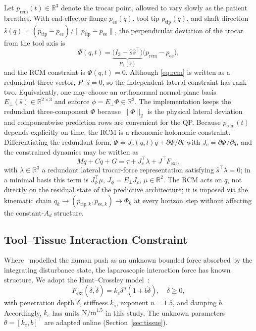 Let $p_{\text{rcm}}(t) \in \mathbb{R}^3$ denote the trocar point, allowed to vary slowly as the patient breathes. With end-effector flange $p_{\text{ee}}(q)$, tool tip $p_{\text{tip}}(q)$, and shaft direction $\hat{s}(q) = (p_{\text{tip}} - p_{\text{ee}})/\|p_{\text{tip}} - p_{\text{ee}}\|$, the perpendicular deviation of the trocar from the tool axis is
\begin{equation}
\Phi(q,t) =
\underbrace{\big(I_3-\hat{s}\hat{s}^{\top}\big)}_{P_{\perp}(\hat s)}
\big(p_{\text{rcm}} - p_{\text{ee}}\big),
\label{eq:rcm}
\end{equation}
and the RCM constraint is $\Phi(q,t) = 0$. Although \eqref{eq:rcm} is written as a redundant three-vector, $P_\perp\hat{s}=0$, so the independent lateral constraint has rank two. Equivalently, one may choose an orthonormal normal-plane basis $E_\perp(\hat{s})\in\mathbb{R}^{2\times3}$ and enforce $\phi=E_\perp\Phi\in\mathbb{R}^2$. The implementation keeps the redundant three-component $\Phi$ because $\|\Phi\|_2$ is the physical lateral deviation and componentwise prediction rows are convenient for the QP. Because $p_{\text{rcm}}(t)$ depends explicitly on time, the RCM is a rheonomic holonomic constraint. Differentiating the redundant form, $\dot{\Phi} = J_c(q,t)\dot{q} + \partial\Phi/\partial t$ with $J_c = \partial\Phi/\partial q$, and the constrained dynamics may be written as
\begin{equation}
M\ddot{q} + C\dot{q} + G = \tau + J_c^\top \lambda + J^\top F_{\text{ext}},
\label{eq:constrained}
\end{equation}
with $\lambda \in \mathbb{R}^3$ a redundant lateral trocar-force representation satisfying $\hat{s}^\top\lambda=0$; in a minimal basis this term is $J_\phi^\top\mu$, $J_\phi=E_\perp J_c$, $\mu\in\mathbb{R}^2$. The RCM acts on $q$, not directly on the residual state of the predictive architecture; it is imposed via the kinematic chain $q_k \to (p_{\text{tip},k}, p_{\text{ee},k}) \to \Phi_k$ at every horizon step without affecting the constant-$A_d$ structure.

\subsection{Tool--Tissue Interaction Constraint}

Where~\cite{cao2026phri} modelled the human push as an unknown bounded force absorbed by the integrating disturbance state, the laparoscopic interaction force has known structure. We adopt the Hunt--Crossley model~\cite{hunt1975,diolaiti2005}:
\begin{equation}
F_{\text{ext}}(\delta, \dot{\delta}) = k_e \delta^n (1 + b\dot{\delta}), \quad \delta \ge 0,
\label{eq:hc}
\end{equation}
with penetration depth $\delta$, stiffness $k_e$, exponent $n=1.5$, and damping $b$. Accordingly, $k_e$ has units $\mathrm{N/m}^{1.5}$ in this study. The unknown parameters $\theta=[k_e,b]^\top$ are adapted online (Section~\ref{sec:tissue}).

